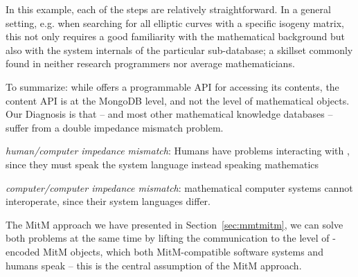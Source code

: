 In this example, each of the steps are relatively straightforward. 
In a general setting, e.g. when searching for all elliptic curves with a specific isogeny matrix, this not only requires a good familiarity with the mathematical background but also with the system internals of the particular \lmfdb sub-database; a skillset commonly found in neither research programmers nor average mathematicians.   

To summarize: while \lmfdb offers a programmable API for accessing its contents, the content API is at the MongoDB level, and not the level of mathematical objects. 
Our Diagnosis is that \lmfdb -- and most other mathematical knowledge databases -- suffer from a double impedance mismatch problem.
\begin{compactenum}[\bf {I}1]
\item \emph{human/computer impedance mismatch}: Humans have problems interacting with \lmfdb, since they must speak the system language instead \lmfdb speaking mathematics
\item \emph{computer/computer impedance mismatch}: mathematical computer systems cannot interoperate, since their system languages differ.
\end{compactenum}
The MitM approach we have presented in Section~\ref{sec:mmtmitm}, we can solve both problems at the same time by lifting the communication to the level of \ommt-encoded MitM objects, which both MitM-compatible software systems and humans speak -- this is the central assumption of the MitM approach.

